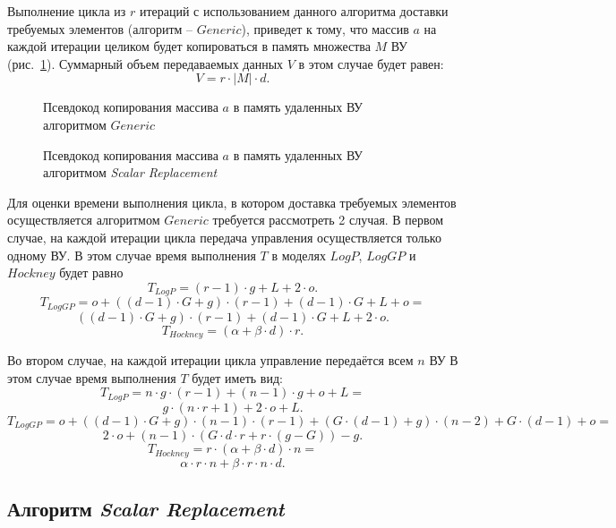 Выполнение цикла из $r$ итераций с использованием данного алгоритма доставки
требуемых элементов (алгоритм -- $Generic$), приведет к тому, что массив $a$ на
каждой итерации целиком будет копироваться в память множества $M$ ВУ
(рис.~\ref{list:r_iterations_loop_generic}). Суммарный объем передаваемых данных
$V$ в этом случае будет равен:
\[ V = r \cdot |M| \cdot d. \]
\begin{figure}[!h]
	
    \caption{Псевдокод копирования массива $a$ в память удаленных ВУ алгоритмом 
$Generic$}
    \label{list:r_iterations_loop_generic}
\end{figure}

\begin{figure}[!h]
	
    \caption{Псевдокод копирования массива $a$ в память удаленных ВУ алгоритмом
\textit{Scalar Replacement}}
    \label{list:r_iterations_loop_scalar_replacement}
\end{figure}

Для оценки времени выполнения цикла, в котором доставка требуемых элементов
осуществляется алгоритмом $Generic$ требуется рассмотреть 2 случая.
В первом случае, на каждой итерации цикла передача управления осуществляется
только одному ВУ. В этом случае время выполнения $T$ в моделях $LogP$, $LogGP$
и $Hockney$ будет равно
\[ T_{LogP} = (r - 1) \cdot g + L + 2 \cdot o. \]
\[ T_{LogGP} = o + ((d - 1) \cdot G + g) \cdot (r - 1) + (d - 1) \cdot G + L + o
= \]
\[ ((d - 1) \cdot G + g) \cdot (r - 1) + (d - 1) \cdot G + L + 2 \cdot o.\]
\[ T_{Hockney} = (\alpha + \beta \cdot d) \cdot r.\]

Во втором случае, на каждой итерации цикла управление передаётся всем $n$ ВУ
В этом случае время выполнения $T$ будет иметь вид:
\[ T_{LogP} = n \cdot g \cdot (r - 1) + (n - 1) \cdot g + o + L = \]
\[ g \cdot (n \cdot r + 1) + 2 \cdot o + L. \]
\[ T_{LogGP} = o + ((d - 1) \cdot G + g) \cdot (n - 1) \cdot (r - 1) +
(G \cdot (d -1) + g) \cdot (n - 2) + G \cdot (d - 1) + o = \]
\[ 2 \cdot o + (n - 1) \cdot (G \cdot d \cdot r + r \cdot (g - G)) - g. \]
\[ T_{Hockney} = r \cdot (\alpha + \beta \cdot d) \cdot n =\]
\[ \alpha \cdot r \cdot n + \beta \cdot r \cdot n \cdot d. \]

\subsection{Алгоритм \textit{Scalar Replacement}}


